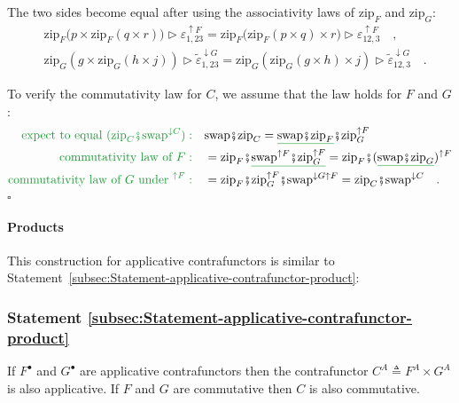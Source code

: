 The two sides become equal after using the associativity laws of $\text{zip}_{F}$
and $\text{zip}_{G}$:
\begin{align*}
 & \text{zip}_{F}\big(p\times\text{zip}_{F}(q\times r)\big)\triangleright\varepsilon_{1,23}^{\uparrow F}=\text{zip}_{F}\big(\text{zip}_{F}(p\times q)\times r\big)\triangleright\varepsilon_{12,3}^{\uparrow F}\quad,\\
 & \text{zip}_{G}(g\times\text{zip}_{G}(h\times j))\triangleright\tilde{\varepsilon}_{1,23}^{\downarrow G}=\text{zip}_{G}(\text{zip}_{G}(g\times h)\times j)\triangleright\tilde{\varepsilon}_{12,3}^{\downarrow G}\quad.
\end{align*}

To verify the commutativity law for $C$, we assume that the law holds
for $F$ and $G$:
\begin{align*}
{\color{greenunder}\text{expect to equal }(\text{zip}_{C}\bef\text{swap}^{\downarrow C}):}\quad & \text{swap}\bef\text{zip}_{C}=\gunderline{\text{swap}\bef\text{zip}_{F}}\bef\text{zip}_{G}^{\uparrow F}\\
{\color{greenunder}\text{commutativity law of }F:}\quad & =\text{zip}_{F}\bef\gunderline{\text{swap}^{\uparrow F}\bef\text{zip}_{G}^{\uparrow F}}=\text{zip}_{F}\bef(\gunderline{\text{swap}\bef\text{zip}_{G}})^{\uparrow F}\\
{\color{greenunder}\text{commutativity law of }G\text{ under }^{\uparrow F}:}\quad & =\text{zip}_{F}\bef\text{zip}_{G}^{\uparrow F}\bef\text{swap}^{\downarrow G\uparrow F}=\text{zip}_{C}\bef\text{swap}^{\downarrow C}\quad.
\end{align*}
$\square$

\paragraph{Products}

This construction for applicative contrafunctors is similar to Statement~\ref{subsec:Statement-applicative-contrafunctor-product}:

\subsubsection{Statement \label{subsec:Statement-applicative-contrafunctor-product}\ref{subsec:Statement-applicative-contrafunctor-product}}

If $F^{\bullet}$ and $G^{\bullet}$ are applicative contrafunctors
then the contrafunctor $C^{A}\triangleq F^{A}\times G^{A}$ is also
applicative. If $F$ and $G$ are commutative then $C$ is also commutative.

